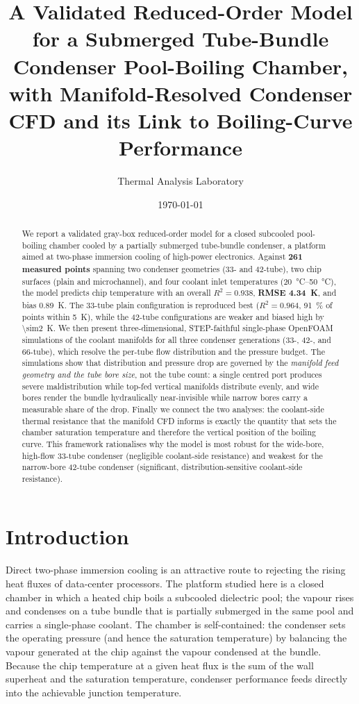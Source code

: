 \documentclass[11pt]{article}
\title{\bfseries A Validated Reduced-Order Model for a Submerged Tube-Bundle Condenser
Pool-Boiling Chamber, with Manifold-Resolved Condenser CFD and its Link to Boiling-Curve Performance}
\author[1]{Thermal Analysis Laboratory}
\affil[1]{Department of Mechanical Engineering, Rochester Institute of Technology}
\date{\today}
\begin{document}
\maketitle

\begin{abstract}
\noindent
We report a validated gray-box reduced-order model for a closed subcooled pool-boiling
chamber cooled by a partially submerged tube-bundle condenser, a platform aimed at
two-phase immersion cooling of high-power electronics. Against \textbf{261 measured points}
spanning two condenser geometries (33- and 42-tube), two chip surfaces (plain and
microchannel), and four coolant inlet temperatures (\SIrange{20}{50}{\degreeCelsius}), the
model predicts chip temperature with an overall \textbf{$R^2=0.938$}, \textbf{RMSE
\SI{4.34}{\kelvin}}, and bias \SI{+0.89}{\kelvin}. The 33-tube plain configuration is
reproduced best ($R^2=0.964$, \SI{91}{\percent} of points within \SI{5}{\kelvin}), while the
42-tube configurations are weaker and biased high by \SI{\sim2}{\kelvin}. We then present
three-dimensional, STEP-faithful single-phase OpenFOAM simulations of the coolant manifolds
for all three condenser generations (33-, 42-, and 66-tube), which resolve the per-tube flow
distribution and the pressure budget. The simulations show that distribution and pressure
drop are governed by the \emph{manifold feed geometry and the tube bore size}, not the tube
count: a single centred port produces severe maldistribution while top-fed vertical manifolds
distribute evenly, and wide bores render the bundle hydraulically near-invisible while narrow
bores carry a measurable share of the drop. Finally we connect the two analyses: the
coolant-side thermal resistance that the manifold CFD informs is exactly the quantity that
sets the chamber saturation temperature and therefore the vertical position of the boiling
curve. This framework rationalises why the model is most robust for the wide-bore, high-flow
33-tube condenser (negligible coolant-side resistance) and weakest for the narrow-bore 42-tube
condenser (significant, distribution-sensitive coolant-side resistance).
\end{abstract}

\section{Introduction}
Direct two-phase immersion cooling is an attractive route to rejecting the rising heat fluxes
of data-center processors. The platform studied here is a closed chamber in which a heated chip
boils a subcooled dielectric pool; the vapour rises and condenses on a tube bundle that is
partially submerged in the same pool and carries a single-phase coolant. The chamber is
self-contained: the condenser sets the operating pressure (and hence the saturation
temperature) by balancing the vapour generated at the chip against the vapour condensed at the
bundle. Because the chip temperature at a given heat flux is the sum of the wall superheat and
the saturation temperature, condenser performance feeds directly into the achievable junction
temperature.
\end{document}
